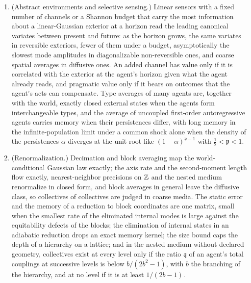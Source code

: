 \begin{hypothesis}
\begin{enumerate}
\item[(c)] (Abstract environments and selective sensing.) Linear sensors with a fixed number of channels or a Shannon budget that carry the most information about a linear-Gaussian exterior at a horizon read the leading canonical variates between present and future: as the horizon grows, the same variates in reversible exteriors, fewer of them under a budget, asymptotically the slowest mode amplitudes in diagonalizable non-reversible ones, and coarse spatial averages in diffusive ones. An added channel has value only if it is correlated with the exterior at the agent's horizon given what the agent already reads, and pragmatic value only if it bears on outcomes that the agent's acts can compensate. Type averages of many agents are, together with the world, exactly closed external states when the agents form interchangeable types, and the average of uncoupled first-order autoregressive agents carries memory when their persistences differ, with long memory in the infinite-population limit under a common shock alone when the density of the persistences $\alpha$ diverges at the unit root like $(1-\alpha)^{\mathfrak p-1}$ with $\frac12<\mathfrak p<1$.
\item[(d)] (Renormalization.) Decimation and block averaging map the world-conditional Gaussian law exactly; the axis rate and the second-moment length flow exactly, nearest-neighbor precisions on $\mathbb{Z}$ and the nested medium renormalize in closed form, and block averages in general leave the diffusive class, so collectives of collectives are judged in coarse media. The static error and the memory of a reduction to block coordinates are one matrix, small when the smallest rate of the eliminated internal modes is large against the equitability defects of the blocks; the elimination of internal states in an adiabatic reduction drops an exact memory kernel; the size bound caps the depth of a hierarchy on a lattice; and in the nested medium without declared geometry, collectives exist at every level only if the ratio $\mathfrak q$ of an agent's total couplings at successive levels is below $b/(2b^2-1)$, with $b$ the branching of the hierarchy, and at no level if it is at least $1/(2b-1)$.
\end{enumerate}
\end{hypothesis}

